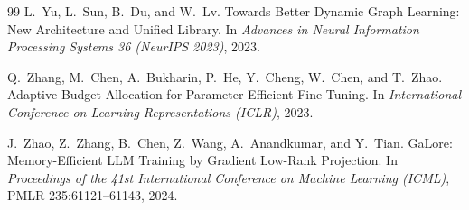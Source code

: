 \begin{thebibliography}{99}
L.~Yu, L.~Sun, B.~Du, and W.~Lv.
\newblock Towards Better Dynamic Graph Learning: New Architecture and Unified Library.
\newblock In \emph{Advances in Neural Information Processing Systems 36 (NeurIPS 2023)}, 2023.

Q.~Zhang, M.~Chen, A.~Bukharin, P.~He, Y.~Cheng, W.~Chen, and T.~Zhao.
\newblock Adaptive Budget Allocation for Parameter-Efficient Fine-Tuning.
\newblock In \emph{International Conference on Learning Representations (ICLR)}, 2023.

J.~Zhao, Z.~Zhang, B.~Chen, Z.~Wang, A.~Anandkumar, and Y.~Tian.
\newblock GaLore: Memory-Efficient LLM Training by Gradient Low-Rank Projection.
\newblock In \emph{Proceedings of the 41st International Conference on Machine Learning (ICML)}, PMLR 235:61121--61143, 2024.

\end{thebibliography}
